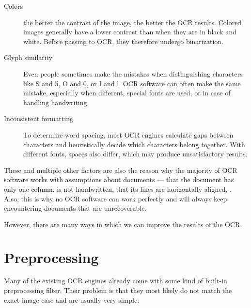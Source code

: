 \begin{description}
\item[Colors]  the better the contrast of the image, the better the OCR results. Colored images generally have a lower contrast than when they are in black and white. Before passing to OCR, they therefore undergo binarization.
\item[Glyph similarity] Even people sometimes make the mistakes when distinguishing characters like S and 5, O and 0, or I and l. OCR software can often make the same mistake, especially when different, special fonts are used, or in case of handling handwriting.
\item[Inconsistent formatting] To determine word spacing, most OCR engines calculate gaps between characters and heuristically decide which characters belong together. With different fonts, spaces also differ, which may produce unsatisfactory results.
\end{description}

These and multiple other factors are also the reason why the majority of OCR software works with assumptions  about documents ---  that the document has only one column, is not handwritten, that its lines are horizontally aligned, . Also, this is why no OCR software can work perfectly and will always keep encountering documents that are unrecoverable. 

However, there are many ways in which we can improve the results of the OCR. 

\section{Preprocessing}

Many of the existing OCR engines already come with some kind of built-in preprocessing filter. Their problem is that they most likely do not match the exact image case and are usually very simple.

